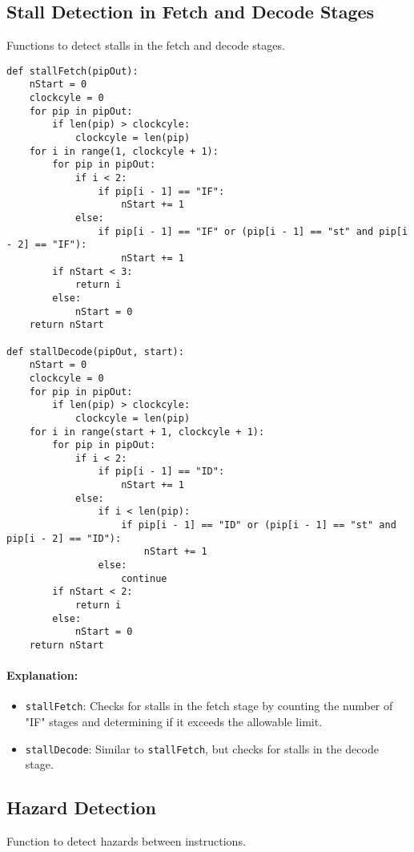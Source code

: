 \documentclass{article}
\begin{document}
\subsection{Stall Detection in Fetch and Decode Stages}
Functions to detect stalls in the fetch and decode stages.

\begin{lstlisting}[caption={Stall Detection}]
def stallFetch(pipOut):
    nStart = 0
    clockcyle = 0
    for pip in pipOut:
        if len(pip) > clockcyle:
            clockcyle = len(pip)
    for i in range(1, clockcyle + 1):
        for pip in pipOut:
            if i < 2:
                if pip[i - 1] == "IF":
                    nStart += 1
            else:
                if pip[i - 1] == "IF" or (pip[i - 1] == "st" and pip[i - 2] == "IF"):
                    nStart += 1
        if nStart < 3:
            return i
        else:
            nStart = 0
    return nStart

def stallDecode(pipOut, start):
    nStart = 0
    clockcyle = 0
    for pip in pipOut:
        if len(pip) > clockcyle:
            clockcyle = len(pip)
    for i in range(start + 1, clockcyle + 1):
        for pip in pipOut:
            if i < 2:
                if pip[i - 1] == "ID":
                    nStart += 1
            else:
                if i < len(pip):
                    if pip[i - 1] == "ID" or (pip[i - 1] == "st" and pip[i - 2] == "ID"):
                        nStart += 1
                else:
                    continue
        if nStart < 2:
            return i
        else:
            nStart = 0
    return nStart
\end{lstlisting}

\paragraph{Explanation:}
\begin{itemize}
    \item \texttt{stallFetch}: Checks for stalls in the fetch stage by counting the number of "IF" stages and determining if it exceeds the allowable limit.
    \item \texttt{stallDecode}: Similar to \texttt{stallFetch}, but checks for stalls in the decode stage.
\end{itemize}

\newpage
\subsection{Hazard Detection}
Function to detect hazards between instructions.
\end{document}
